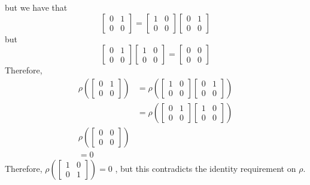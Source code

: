 \documentclass[]{article}
\begin{document}
but we have that
\begin{equation}
	\begin{bmatrix}
		0 & 1 \\
		0 & 0 
	\end{bmatrix}
	= 
	\begin{bmatrix}
		1 & 0 \\
		0 & 0 
	\end{bmatrix}
	\begin{bmatrix}
		0 & 1 \\
		0 & 0 
	\end{bmatrix}
\end{equation}
but 
\begin{equation}
	\begin{bmatrix}
		0 & 1 \\
		0 & 0 
	\end{bmatrix}
	\begin{bmatrix}
		1 & 0 \\
		0 & 0 
	\end{bmatrix}
	=
	\begin{bmatrix}
	0 & 0 \\
	0 & 0 
	\end{bmatrix}
\end{equation}
Therefore,
\begin{align*}
\rho\left(
	\begin{bmatrix}
	0 & 1 \\
	0 & 0 
\end{bmatrix}
\right)
&=
\rho\left(
\begin{bmatrix}
	1 & 0 \\
	0 & 0 
\end{bmatrix}
\begin{bmatrix}
	0 & 1 \\
	0 & 0 
\end{bmatrix}
\right)\\
&=
\rho\left(
\begin{bmatrix}
	0 & 1 \\
	0 & 0 
\end{bmatrix}
\begin{bmatrix}
	1 & 0 \\
	0 & 0 
\end{bmatrix}
\right)\\
\rho\left(
\begin{bmatrix}
	0 & 0 \\
	0 & 0 
\end{bmatrix}
\right)\\
= 0
\end{align*}
Therefore, $\rho\left(
\begin{bmatrix}
	1 & 0 \\
	0 & 1
\end{bmatrix}
\right)
= 0
$
, but this contradicts the identity requirement on $\rho$. 
\end{document}
